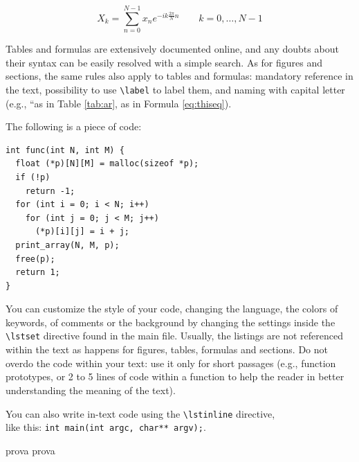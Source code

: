 \begin{equation}\label{eq:thiseq}
X_{k}=\sum _{n=0}^{N-1}x_{n}e^{-ik{\frac {2\pi }{N}}n}\quad \quad k=0,\dots ,N-1
\end{equation}

Tables and formulas are extensively documented online, and any doubts about their syntax can be easily resolved with a simple search. As for figures and sections, the same rules also apply to tables and formulas: mandatory reference in the text, possibility to use \lstinline{\label} to label them, and naming with capital letter (e.g., ``as in Table \ref{tab:ar}, as in Formula \ref{eq:thiseq}).

The following is a piece of code:

\begin{lstlisting}
int func(int N, int M) {
  float (*p)[N][M] = malloc(sizeof *p);
  if (!p)
    return -1;
  for (int i = 0; i < N; i++)
    for (int j = 0; j < M; j++)
      (*p)[i][j] = i + j;
  print_array(N, M, p);
  free(p);
  return 1;
}
\end{lstlisting}

You can customize the style of your code, changing the language, the colors of keywords, of comments or the background by changing the settings inside the \lstinline{\lstset} directive found in the main file. Usually, the listings are not referenced within the text as happens for figures, tables, formulas and sections. Do not overdo the code within your text: use it only for short passages (e.g., function prototypes, or 2 to 5 lines of code within a function to help the reader in better understanding the meaning of the text).

You can also write in-text code using the \lstinline{\lstinline} directive, \\
like this: \lstinline{int main(int argc, char** argv);}.

prova prova \cite{9149314}